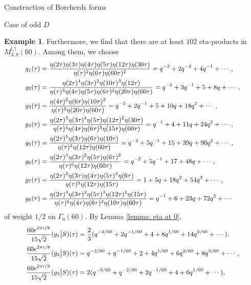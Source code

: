 \documentclass{amsart}
\newcounter{lemma}
\theoremstyle{definition}
\newtheorem{Example}[lemma]{Example}
\begin{document}
\begin{section}{Construction of Borcherds forms}
\begin{subsection}{Case of odd $D$}
\begin{Example}
  Furthermore, we find that there are at least $102$ eta-products in
  $M^{!,!}_{3,8}(60)$. Among them, we choose
  \begin{equation*} \small
  \begin{split}
    g_1(\tau)&=
    \frac{\eta(2\tau)\eta(3\tau)\eta(4\tau)\eta(5\tau)\eta(12\tau)\eta(30\tau)}
    {\eta(\tau)^2\eta(6\tau)\eta(60\tau)^2}
     =q^{-3}+2q^{-2}+4q^{-1}+\cdots, \\
    g_2(\tau)&=
    \frac{\eta(2\tau)^4\eta(3\tau)^2\eta(10\tau)^3\eta(12\tau)}
    {\eta(\tau)^3\eta(4\tau)\eta(5\tau)\eta(6\tau)^2\eta(20\tau)\eta(60\tau)}
     =q^{-2}+3q^{-1}+5+8q+\cdots, \\
    g_3(\tau)&=
    \frac{\eta(4\tau)^2\eta(6\tau)\eta(10\tau)^2}
    {\eta(\tau)^2\eta(20\tau)\eta(60\tau)}
   =q^{-2}+2q^{-1}+5+10q+18q^2+\cdots, \\
    g_4(\tau)&=
    \frac{\eta(2\tau)^3\eta(3\tau)^4\eta(5\tau)\eta(12\tau)^2\eta(30\tau)}
    {\eta(\tau)^4\eta(4\tau)\eta(6\tau)^3\eta(15\tau)\eta(60\tau)}
   =q^{-1}+4+11q+24q^2+\cdots, \\
    g_5(\tau)&=
    \frac{\eta(2\tau)^5\eta(3\tau)\eta(6\tau)\eta(10\tau)}
    {\eta(\tau)^5\eta(12\tau)\eta(60\tau)}
   =q^{-2}+5q^{-1}+15+39q+90q^2+\cdots, \\
    g_6(\tau)&=
    \frac{\eta(2\tau)^3\eta(3\tau)^2\eta(5\tau)\eta(6\tau)^2}
    {\eta(\tau)^5\eta(12\tau)\eta(60\tau)}
   =q^{-2}+5q^{-1}+17+48q+\cdots, \\
    g_7(\tau)&=
    \frac{\eta(2\tau)^2\eta(3\tau)\eta(4\tau)\eta(5\tau)^3\eta(6\tau)}
    {\eta(\tau)^5\eta(12\tau)\eta(15\tau)}
   =1+5q+18q^2+54q^3+\cdots, \\
    g_8(\tau)&=
    \frac{\eta(2\tau)^4\eta(3\tau)^2\eta(5\tau)^3\eta(12\tau)^2\eta(15\tau)}
    {\eta(\tau)^6\eta(4\tau)\eta(6\tau)^2\eta(10\tau)\eta(60\tau)}
   =q^{-1}+6+23q+72q^2+\cdots
  \end{split}
  \end{equation*}
  of weight $1/2$ on $\Gamma_0(60)$. By
  Lemma \ref{lemma: eta at 0},
  \begin{equation*} \small
  \begin{split}
  \frac{60e^{2\pi i/8}}{15\sqrt2}(g_1\big|S)(\tau)
  &=\frac2{3}(q^{-2/60}+2q^{-1/60}+4+8q^{1/60}+14q^{2/60}+\cdots), \\
  \frac{60e^{2\pi i/8}}{15\sqrt2}(g_2\big|S)(\tau)
  &=q^{-2/60}+q^{-1/60}+2+4q^{1/60}+6q^{2/60}+8q^{3/60}+\cdots, \\
  \frac{60e^{2\pi i/8}}{15\sqrt2}(g_3\big|S)(\tau)
  &=2(q^{-3/60}+q^{-2/60}+2q^{-1/60}+4+6q^{1/60}+\cdots), \\

\end{split}
\end{equation*}
\end{Example}
\end{subsection}
\end{section}
\end{document}
